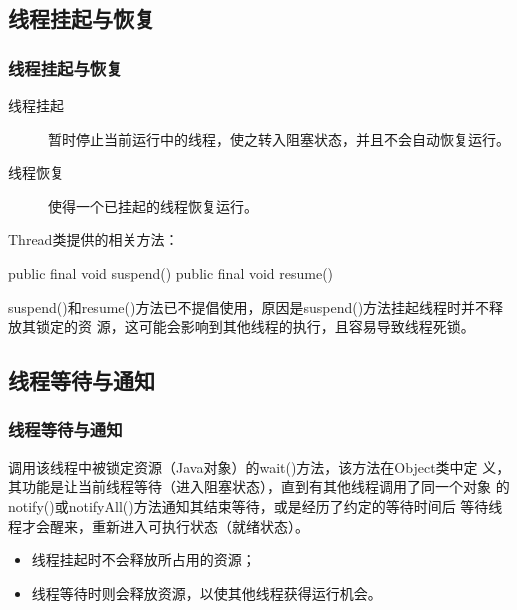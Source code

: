 \subsection{线程挂起与恢复}

\begin{frame}[fragile] %
  \frametitle{线程挂起与恢复}

  \begin{description}
  \item[线程挂起] 暂时停止当前运行中的线程，使之转入{\hei\Blue 阻塞状态}，并且不会自动恢复运行。
  \item[线程恢复] 使得一个已挂起的线程恢复运行。
  \end{description}
  
  Thread类提供的相关方法：
  \begin{javaCode}
    public final void suspend()
    public final void resume()
  \end{javaCode}


  {\kai suspend()和resume()方法已不提倡使用，原因是suspend()方法挂起线程时并不释放其锁定的资
    源，这可能会影响到其他线程的执行，且容易导致线程死锁。}
\end{frame}

\subsection{线程等待与通知}

\begin{frame}[fragile] %
  \frametitle{线程等待与通知}


  调用该线程中被锁定资源（Java对象）的wait()方法，该方法在Object类中定
  义，其功能是让当前线程等待{（进入\hei\Blue 阻塞状态）}，直到有其他线程调用了同一个对象
  的notify()或notifyAll()方法通知其结束等待，或是经历了约定的等待时间后
  等待线程才会醒来，重新进入可执行状态（{\hei\Blue 就绪状态}）。

  \pause
  
  
  \begin{itemize}
  \item 线程挂起时不会释放所占用的资源；
  \item 线程等待时则会释放资源，以使其他线程获得运行机会。
  \end{itemize}
\end{frame}

